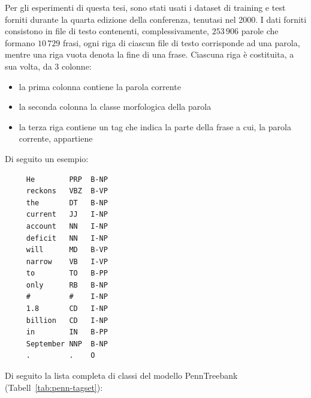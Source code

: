 Per gli esperimenti di questa tesi, sono stati usati i dataset di training e
test forniti durante la quarta edizione della conferenza, tenutasi nel 2000.
I dati forniti consistono in file di testo contenenti, complessivamente, $253\,906$
parole che formano $10\,729$ frasi, ogni riga di ciascun file di testo corrisponde
ad una parola, mentre una riga vuota denota la fine di una frase. Ciascuna riga
\`e costituita, a sua volta, da 3 colonne:

\begin{itemize}
  \item la prima colonna contiene la parola corrente
  \item la seconda colonna la classe morfologica della parola
  \item la terza riga contiene un tag che indica la parte della frase a cui,
        la parola corrente, appartiene
\end{itemize}

Di seguito un esempio:

\begin{center}
  \begin{minipage}{5cm}
    \begin{verbatim}
     He        PRP  B-NP
     reckons   VBZ  B-VP
     the       DT   B-NP
     current   JJ   I-NP
     account   NN   I-NP
     deficit   NN   I-NP
     will      MD   B-VP
     narrow    VB   I-VP
     to        TO   B-PP
     only      RB   B-NP
     #         #    I-NP
     1.8       CD   I-NP
     billion   CD   I-NP
     in        IN   B-PP
     September NNP  B-NP
     .         .    O
    \end{verbatim}
  \end{minipage}
\end{center}

Di seguito la lista completa di classi del modello PennTreebank (Tabell~\ref{tab:penn-tagset}):

